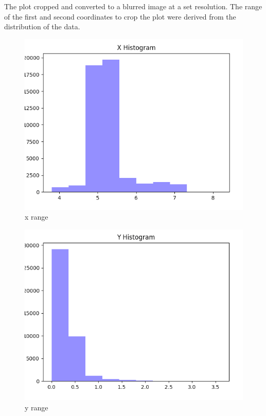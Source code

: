 \documentclass[12pt, a4paper, twocolumn, fullpage]{article}
\theoremstyle{plain}
\theoremstyle{definition}
\theoremstyle{remark}
\begin{document}
The plot cropped and converted to a blurred image at a set resolution. The range of the first and second coordinates to crop the plot were derived from the distribution of the data.

\begin{figure}
    \includegraphics[width=\linewidth]{xhist.png}
    \caption{x range}
    \label{xhist}
\end{figure}

\begin{figure}
    \includegraphics[width=\linewidth]{yhist.png}
    \caption{y range}
    \label{yhist}
\end{figure}
\end{document}
